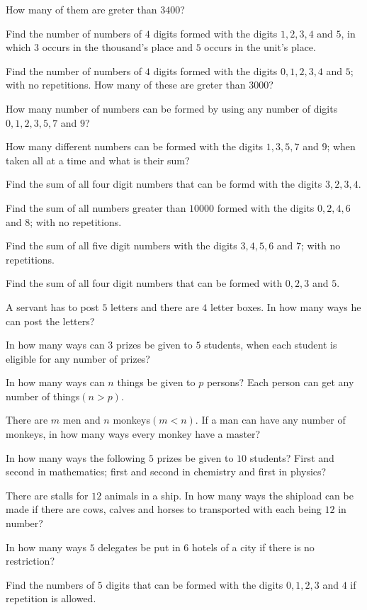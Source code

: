   How many of them are greter than $3400$?
\item Find the number of numbers of $4$ digits formed with the digits $1, 2, 3, 4$ and $5$, in which $3$ occurs in the thousand's
  place and $5$ occurs in the unit's place.
\item Find the number of numbers of $4$ digits formed with the digits $0, 1, 2, 3, 4$ and $5$; with no repetitions. How many of
  these are greter than $3000$?
\item How many number of numbers can be formed by using any number of digits $0, 1, 2, 3, 5, 7$ and $9$?
\item How many different numbers can be formed with the digits $1, 3, 5, 7$ and $9$; when taken all at a time and what is their
  sum?
\item Find the sum of all four digit numbers that can be formd with the digits $3, 2, 3, 4$.
\item Find the sum of all numbers greater than $10000$ formed with the digits $0, 2, 4, 6$ and $8$; with no repetitions.
\item Find the sum of all five digit numbers with the digits $3, 4, 5, 6$ and $7$; with no repetitions.
\item Find the sum of all four digit numbers that can be formed with $0, 2, 3$ and $5$.
\item A servant has to post $5$ letters and there are $4$ letter boxes. In how many ways he can post the letters?
\item In how many ways can $3$ prizes be given to $5$ students, when each student is eligible for any number of prizes?
\item In how many ways can $n$ things be given to $p$ persons? Each person can get any number of things$(n > p)$.
\item There are $m$ men and $n$ monkeys$(m < n)$. If a man can have any number of monkeys, in how many ways every monkey have a
  master?
\item In how many ways the following $5$ prizes be given to $10$ students? First and second in mathematics; first and second in
  chemistry and first in physics?
\item There are stalls for $12$ animals in a ship. In how many ways the shipload can be made if there are cows, calves and horses
  to transported with each being $12$ in number?
\item In how many ways $5$ delegates be put in $6$ hotels of a city if there is no restriction?
\item Find the numbers of $5$ digits that can be formed with the digits $0, 1, 2, 3$ and $4$ if repetition is allowed.

